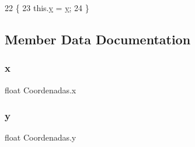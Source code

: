 \begin{DoxyCode}
22                               \{
23         this.\mbox{\hyperlink{class_coordenadas_a6b4555727809eb63ae63e171533476b8}{y}} = \mbox{\hyperlink{class_coordenadas_a6b4555727809eb63ae63e171533476b8}{y}};
24     \}
\end{DoxyCode}


\subsection{Member Data Documentation}
\mbox{\label{class_coordenadas_a89574ed799dfc39e198c8e8096670bf1}} 
\subsubsection{\texorpdfstring{x}{x}}
{\footnotesize\ttfamily float Coordenadas.\+x\hspace{0.3cm}{\ttfamily [private]}}

\mbox{\label{class_coordenadas_a6b4555727809eb63ae63e171533476b8}} 
\subsubsection{\texorpdfstring{y}{y}}
{\footnotesize\ttfamily float Coordenadas.\+y\hspace{0.3cm}{\ttfamily [package]}}

